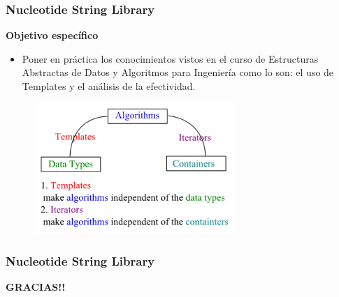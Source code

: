 \documentclass{beamer}
\begin{document}
\begin{frame}
\frametitle{Nucleotide String Library}
\textbf{\large{Objetivo específico}}
\begin{itemize}
\item Poner en práctica los conocimientos vistos en el curso de Estructuras Abstractas de Datos y Algoritmos para Ingeniería como lo son: el uso de Templates y el análisis de la efectividad.
\end{itemize}
\begin{figure}
		\includegraphics[width=3.0in]{templates.png}
\end{figure}
\end{frame}

\begin{frame}
\frametitle{Nucleotide String Library}
\textbf{\large{GRACIAS!!}}
\end{frame}
\end{document}
